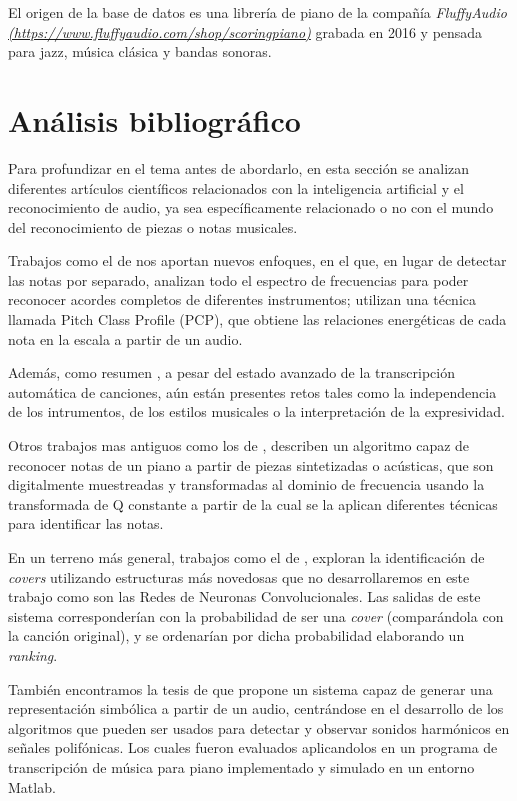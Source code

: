 \documentclass[12pt]{article}
\begin{document}
\bigskip
El origen de la base de datos es una librería de piano de la compañía \textit{FluffyAudio} \textit{\url{(https://www.fluffyaudio.com/shop/scoringpiano)}} 
grabada en 2016 y pensada para jazz, música clásica y bandas sonoras.

\section{Análisis bibliográfico}
\label{Análisis bibliográfico}
Para profundizar en el tema antes de abordarlo, en esta sección se analizan diferentes artículos científicos relacionados con la inteligencia
artificial y el reconocimiento de audio, ya sea específicamente relacionado o no con el mundo del reconocimiento de piezas o notas musicales.

\bigskip
Trabajos como el de \cite{osmalsky2012neural} nos aportan nuevos enfoques, 
en el que, en lugar de detectar las notas por separado, analizan todo el espectro de frecuencias para poder reconocer acordes completos de diferentes instrumentos;
utilizan una técnica llamada Pitch Class Profile (PCP), que obtiene las relaciones energéticas de cada nota en la escala a partir de un audio.

\bigskip
Además, como resumen \cite{benetos2018automatic},
a pesar del estado avanzado de la transcripción automática de canciones, aún están presentes retos tales como la independencia de los intrumentos, de los estilos
musicales o la interpretación de la expresividad.

\bigskip
Otros trabajos mas antiguos como los de \cite{foo1999recognition}, describen un algoritmo capaz de reconocer notas
de un piano a partir de piezas sintetizadas o acústicas, que son digitalmente muestreadas y transformadas al dominio de frecuencia usando 
la transformada de Q constante a partir de la cual se la aplican diferentes técnicas para identificar las notas.

\bigskip
En un terreno más general, trabajos como el de \cite{chang2017audio}, exploran la identificación de \textit{covers} utilizando
estructuras más novedosas que no desarrollaremos en este trabajo como son las Redes de Neuronas Convolucionales. Las salidas de este
sistema corresponderían con la probabilidad de ser una \textit{cover} (comparándola con la canción original), y se ordenarían por dicha 
probabilidad elaborando un \textit{ranking}.

\bigskip
También encontramos la tesis de \cite{klapuri2004signal} que propone un sistema capaz de generar una representación 
simbólica a partir de un audio, centrándose en el desarrollo de los algoritmos que pueden ser usados para detectar y observar sonidos harmónicos en señales polifónicas.
Los cuales fueron evaluados aplicandolos en un programa de transcripción de música para piano implementado y simulado en un entorno Matlab.
\end{document}
